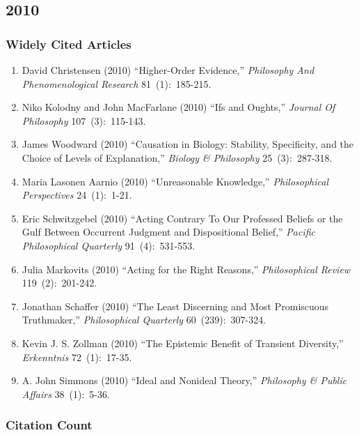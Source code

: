 \documentclass[
  10pt,
  letterpaper,
  DIV=11,
  numbers=noendperiod,
  twoside]{scrartcl}
\providecommand{\tightlist}{%
  \setlength{\itemsep}{0pt}\setlength{\parskip}{0pt}}\usepackage{longtable,booktabs,array}
\begin{document}
\newpage

\subsection{2010}\label{sec-s2010}

\subsubsection*{Widely Cited Articles}\label{widely-cited-articles-53}

\begin{enumerate}
\def\labelenumi{\arabic{enumi}.}
\tightlist
\item
  David Christensen (2010) ``Higher-Order Evidence,'' \emph{Philosophy
  And Phenomenological Research} 81~(1):~185-215.
\item
  Niko Kolodny and John MacFarlane (2010) ``Ifs and Oughts,''
  \emph{Journal Of Philosophy} 107~(3):~115-143.
\item
  James Woodward (2010) ``Causation in Biology: Stability, Specificity,
  and the Choice of Levels of Explanation,'' \emph{Biology \&
  Philosophy} 25~(3):~287-318.
\item
  Maria Lasonen Aarnio (2010) ``Unreasonable Knowledge,''
  \emph{Philosophical Perspectives} 24~(1):~1-21.
\item
  Eric Schwitzgebel (2010) ``Acting Contrary To Our Professed Beliefs or
  the Gulf Between Occurrent Judgment and Dispositional Belief,''
  \emph{Pacific Philosophical Quarterly} 91~(4):~531-553.
\item
  Julia Markovits (2010) ``Acting for the Right Reasons,''
  \emph{Philosophical Review} 119~(2):~201-242.
\item
  Jonathan Schaffer (2010) ``The Least Discerning and Most Promiscuous
  Truthmaker,'' \emph{Philosophical Quarterly} 60~(239):~307-324.
\item
  Kevin J. S. Zollman (2010) ``The Epistemic Benefit of Transient
  Diversity,'' \emph{Erkenntnis} 72~(1):~17-35.
\item
  A. John Simmons (2010) ``Ideal and Nonideal Theory,'' \emph{Philosophy
  \& Public Affairs} 38~(1):~5-36.
\end{enumerate}

\subsubsection*{Citation Count}\label{sec-count-2010}
\end{document}
